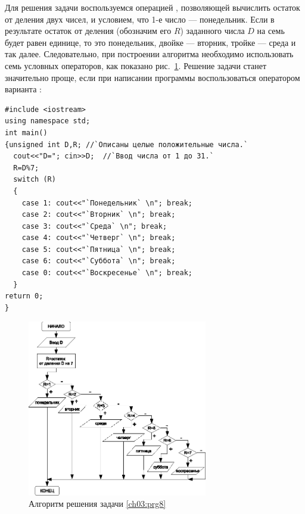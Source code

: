 Для решения задачи воспользуемся операцией \Sys{\%}, позволяющей вычислить остаток от деления двух чисел,
и условием, что 1-е число --- понедельник. Если в результате остаток от деления (обозначим его $R$)
заданного числа $D$ на семь будет равен единице, то это понедельник, двойке --- вторник, тройке --- среда
и так далее. Следовательно, при построении алгоритма необходимо использовать семь условных операторов, как показано
рис.~\ref{ch03:refDrawing20}. Решение задачи станет значительно проще, если при написании 
программы воспользоваться оператором
варианта :
\begin{lstlisting}
#include <iostream>
using namespace std;
int main()
{unsigned int D,R; //`Описаны целые положительные числа.`
  cout<<"D="; cin>>D;  //`Ввод числа от 1 до 31.`
  R=D%7;
  switch (R)
  {
    case 1: cout<<"`Понедельник` \n"; break;
    case 2: cout<<"`Вторник` \n"; break;
    case 3: cout<<"`Среда` \n"; break;
    case 4: cout<<"`Четверг` \n"; break;
    case 5: cout<<"`Пятница` \n"; break;
    case 6: cout<<"`Суббота` \n"; break;
    case 0: cout<<"`Воскресенье` \n"; break;
  }
return 0;
}
\end{lstlisting}
\begin{figure}[htb]
\begin{center}
\includegraphics[width=0.7\textwidth]{img/ris_3_21}
\caption{Алгоритм решения задачи \ref{ch03:prg8}}
\label{ch03:refDrawing20}
\end{center}
\end{figure}

